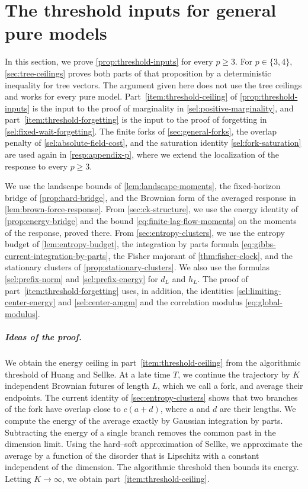 \chapter{The threshold inputs for general pure models}\label{app:general-selection}

In this section, we prove \cref{prop:threshold-inputs} for every $p\ge3$.
For $p\in\{3,4\}$, \cref{sec:tree-ceilings} proves both parts of that
proposition by a deterministic inequality for tree vectors. The argument
given here does not use the tree ceilings and works for every pure model.
Part~\ref{item:threshold-ceiling} of \cref{prop:threshold-inputs} is the
input to the proof of marginality in \cref{sel:positive-marginality}, and
part~\ref{item:threshold-forgetting} is the input to the proof of forgetting
in \cref{sel:fixed-wait-forgetting}. The finite forks of \cref{sec:general-forks}, the overlap penalty of
\cref{sel:absolute-field-cost}, and the saturation identity
\eqref{sel:fork-saturation} are used again in \cref{resp:appendix-p}, where
we extend the localization of the response to every $p\ge3$.

We use the landscape bounds of \cref{lem:landscape-moments}, the fixed-horizon bridge of \cref{prop:hard-bridge}, and the Brownian form of the
averaged response in \cref{lem:brown-force-response}. From
\cref{sec:ck-structure}, we use the energy identity of \cref{prop:energy-bridge} and the bound
\eqref{eq:finite-lag-flow-moments} on the moments of the response, proved there. From
\cref{sec:entropy-clusters}, we use the entropy budget of
\cref{lem:entropy-budget}, the integration by parts formula
\eqref{eq:gibbs-current-integration-by-parts}, the Fisher majorant of
\cref{thm:fisher-clock}, and the stationary clusters of
\cref{prop:stationary-clusters}. We also use the formulas
\eqref{sel:prefix-norm} and \eqref{sel:prefix-energy} for $d_L$ and $h_L$.
The proof of part~\ref{item:threshold-forgetting} uses, in addition, the
identities \eqref{sel:limiting-center-energy} and \eqref{sel:center-amgm}
and the correlation modulus \eqref{eq:global-modulus}.

\paragraph{Ideas of the proof.}
We obtain the energy ceiling in part~\ref{item:threshold-ceiling} from the
algorithmic threshold of Huang and Sellke. At a late time $T$, we continue
the trajectory by $K$ independent Brownian futures of length $L$, which we
call a fork, and average their endpoints. The current identity of
\cref{sec:entropy-clusters} shows that two branches of the fork have
overlap close to $c(a+d)$, where $a$ and $d$ are their lengths. We compute
the energy of the average exactly by Gaussian integration by parts.
Subtracting the energy of a single branch removes the common past in the
dimension limit. Using the hard--soft approximation of Sellke, we approximate the average by
a function of the disorder that is Lipschitz with a constant independent of
the dimension. The algorithmic threshold then bounds its energy. Letting
$K\to\infty$, we obtain part~\ref{item:threshold-ceiling}.

